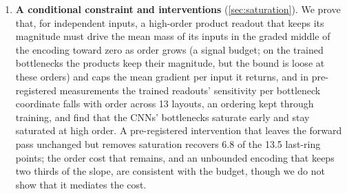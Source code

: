 \begin{enumerate}
        Without entangling gates and with single-qubit readouts the head is exactly a classical per-coordinate sinusoidal model, and
        classical heads of that form come within 0.3--0.9 probe points of it.
  \item \textbf{A conditional constraint and interventions} (\cref{sec:saturation}). We prove that, for independent inputs, a high-order product readout that keeps its magnitude must drive the mean mass of its inputs in the graded middle of the encoding toward zero as order grows (a signal budget; on the trained bottlenecks the products keep their magnitude, but the bound is loose at these orders) and caps the mean gradient per input it returns, and in pre-registered measurements the trained readouts' sensitivity per bottleneck coordinate falls with order across 13 layouts, an ordering kept through training,
        and find that the CNNs' bottlenecks saturate early and stay saturated at high order. A
        pre-registered intervention that leaves the forward pass unchanged but removes saturation
        recovers 6.8 of the 13.5 last-ring points; the order cost that remains, and an unbounded encoding that keeps two thirds of the slope, are consistent with the budget, though we do not show that it mediates the cost.
\end{enumerate}


